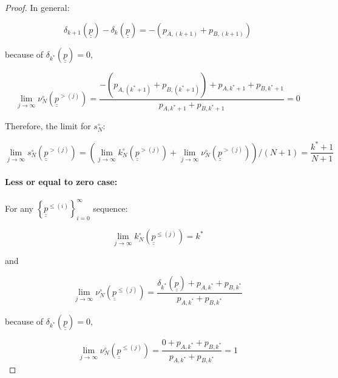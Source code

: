 \documentclass{article}
\theoremstyle{definition}
\begin{document}
\begin{proof}
    In general:

    \begin{equation}
        \delta_{k+1}(\underline{\underline{p}}) - \delta_k(\underline{\underline{p}}) =
        -(p_{A,(k+1)} + p_{B,(k+1)})
    \end{equation}

    because of $\delta_{k^*}(\underline{\underline{p}})=0$,

    \begin{equation}
        \lim_{j\to\infty} \nu^\circ_N (\underline{\underline{p}}^{> (j)}) = 
        \frac{-(p_{A,(k^*+1)} + p_{B,(k^*+1)}) + p_{A,k^*+1}+p_{B,k^*+1} }
        {p_{A,k^*+1}+p_{B,k^*+1}} = 0
    \end{equation}

    Therefore, the limit for $s^\circ_N$:

    \begin{equation}
        \lim_{j\to\infty} s^\circ_N (\underline{\underline{p}}^{> (j)}) = \left ( \lim_{j\to\infty} k^\circ_N(\underline{\underline{p}}^{> (j)}) + \lim_{j\to\infty} \nu^\circ_N(\underline{\underline{p}}^{> (j)}) \right )/(N+1) =
        \frac{k^*+1}{N+1}
    \end{equation}

    \paragraph{Less or equal to zero case:}

    For any $\left \{ \underline{\underline{p}}^{\le (i)} \right \}_{i=0}^\infty$ sequence:

    \begin{equation}
        \lim_{j\to\infty} k^\circ_N (\underline{\underline{p}}^{\le (j)}) = k^*
    \end{equation}

    and

    \begin{equation}
        \lim_{j\to\infty} \nu^\circ_N (\underline{\underline{p}}^{\le (j)}) = 
        \frac{\delta_{k^*}(\underline{\underline{p}}) + p_{A,k^*}+p_{B,k^*} }
        {p_{A,k^*}+p_{B,k^*}}
    \end{equation}

    because of $\delta_{k^*}(\underline{\underline{p}})=0$,

    \begin{equation}
        \lim_{j\to\infty} \nu^\circ_N (\underline{\underline{p}}^{\le (j)}) = 
        \frac{0 + p_{A,k^*}+p_{B,k^*} }
        {p_{A,k^*}+p_{B,k^*}} =
        1
    \end{equation}


\end{proof}
\end{document}
